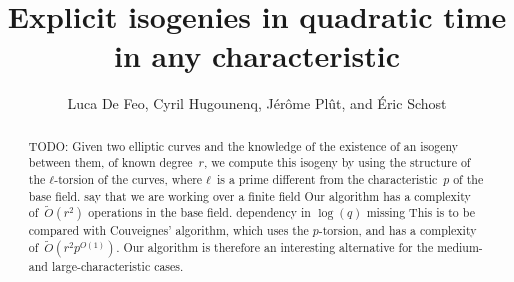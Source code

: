 \documentclass{lms}
\title[Explicit isogenies in any characteristic]{Explicit isogenies in quadratic time in any characteristic}
\author[L. De Feo, C. Hugounenq, J. Plût, É. Schost]%
  {Luca De Feo, Cyril Hugounenq, Jérôme Plût, and Éric Schost}
\newcommand{\todo}[1]{{\color{red}TODO: #1}}
\newcommand{\todoblue}[1]{{\color{blue}#1}}
\newcommand{\tildO}{\tilde{O}}
\begin{document}
\maketitle

\begin{abstract}
\todo{
Given two elliptic curves and the knowledge of the existence of
an isogeny between them, of known degree~$r$,
we compute this isogeny by using
the structure of the $ℓ$-torsion of the curves,
where $ℓ$~is a prime different from the characteristic~$p$ of the base field.
\todoblue{say that we are working over a finite field}
Our algorithm has a complexity of~$\tildO(r^2)$ operations in the base field.
\todoblue{dependency in $\log(q)$ missing}
This is to be compared with Couveignes' algorithm,
which uses the $p$-torsion, and has a complexity of~$\tildO(r^2 p^{O(1)})$.
Our algorithm is therefore an interesting alternative
for the medium- and large-characteristic cases.
}
\end{abstract}



\end{document}
